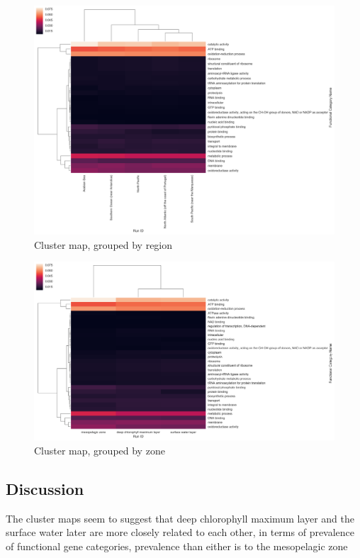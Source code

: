 \documentclass[12pt,a4paper,twocolumn]{article}
\begin{document}
\begin{figure}
\centering
\includegraphics{imgs/cluster/cluster_region.png}
\caption{Cluster map, grouped by region\label{fig:cluster_region}}
\end{figure}

\begin{figure}
\centering
\includegraphics{imgs/cluster/cluster_zone.png}
\caption{Cluster map, grouped by zone\label{fig:cluster_zone}}
\end{figure}

\subsection{Discussion}\label{discussion}

The cluster maps seem to suggest that deep chlorophyll maximum layer and
the surface water later are more closely related to each other, in terms
of prevalence of functional gene categories, prevalence than either is
to the mesopelagic zone
\end{document}
